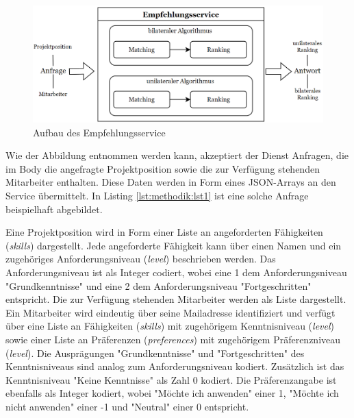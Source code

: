 \begin{figure}[H]
    \centering
	\includegraphics[width=1.0\textwidth]{gfx/empfehlungsservice.png}
	\caption[Aufbau des Empfehlungsservice]{Aufbau des Empfehlungsservice}
	\label{fig:methodik:abb8}
\end{figure}

Wie der Abbildung entnommen werden kann, akzeptiert der Dienst Anfragen, die im Body die angefragte Projektposition sowie die zur Verfügung stehenden Mitarbeiter enthalten.
Diese Daten werden in Form eines JSON-Arrays an den Service übermittelt.
In Listing \ref{lst:methodik:lst1} ist eine solche Anfrage beispielhaft abgebildet.



Eine Projektposition wird in Form einer Liste an angeforderten Fähigkeiten (\textit{skills}) dargestellt.
Jede angeforderte Fähigkeit kann über einen Namen und ein zugehöriges Anforderungsniveau (\textit{level}) beschrieben werden.
Das Anforderungsniveau ist als Integer codiert, wobei eine 1 dem Anforderungsniveau "Grundkenntnisse" und eine 2 dem Anforderungsniveau "Fortgeschritten" entspricht.
Die zur Verfügung stehenden Mitarbeiter werden als Liste dargestellt.
Ein Mitarbeiter wird eindeutig über seine Mailadresse identifiziert und verfügt über eine Liste an Fähigkeiten (\textit{skills}) mit zugehörigem Kenntnisniveau (\textit{level}) sowie einer Liste an Präferenzen (\textit{preferences}) mit zugehörigem Präferenzniveau (\textit{level}).
Die Ausprägungen "Grundkenntnisse" und "Fortgeschritten" des Kenntnisniveaus sind analog zum Anforderungsniveau kodiert.
Zusätzlich ist das Kenntnisniveau "Keine Kenntnisse" als Zahl 0 kodiert.
Die Präferenzangabe ist ebenfalls als Integer kodiert, wobei "Möchte ich anwenden" einer 1, "Möchte ich nicht anwenden" einer -1 und "Neutral" einer 0 entspricht.

